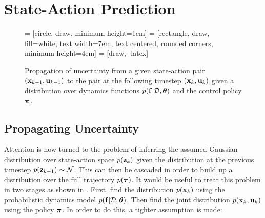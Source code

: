 \section{State-Action Prediction} \label{sec:xuprediction}


\begin{figure}[t]
\centering
{} = [circle, draw, minimum height=1cm]
 = [rectangle, draw, fill=white, text width=7em, text centered, rounded corners, minimum height=4em]
 = [draw, -latex]
%
\caption{Propagation of uncertainty from a given state-action pair $(\mathbf{x}_{k-1},\mathbf{u}_{k-1})$ to the pair at the following timestep $(\mathbf{x}_k,\mathbf{u}_k)$ given a distribution over dynamics functions $p(\mathbf{f}|\mathcal{D},\boldsymbol{\theta})$ and the control policy $\boldsymbol{\pi}$.}
\label{fig:propxu}
\end{figure}

\subsection{Propagating Uncertainty}
Attention is now turned to the problem of inferring the assumed Gaussian distribution over state-action space $p(\mathbf{z}_k)$ given the distribution at the previous timestep $p(\mathbf{z}_{k-1}) \sim \mathcal{N}$. This can then be cascaded in order to build up a distribution over the full trajectory $p(\boldsymbol{\tau})$. It would be useful to treat this problem in two stages as shown in . First, find the distribution $p(\mathbf{x}_k)$ using the probabilistic dynamics model $p(\mathbf{f}|\mathcal{D},\boldsymbol{\theta})$. Then find the joint distribution $p(\mathbf{x}_k,\mathbf{u}_k)$ using the policy $\boldsymbol{\pi}$. In order to do this, a tighter assumption is made:

